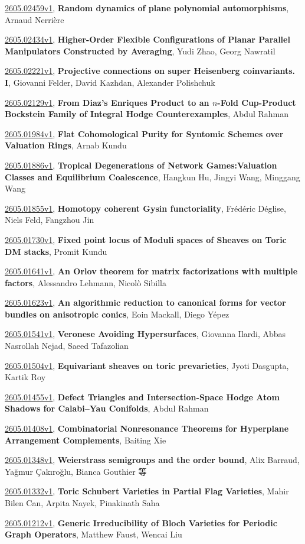\documentclass[9pt, a4paper]{article}
\theoremstyle{plain}
\theoremstyle{definition}
\theoremstyle{remark}
\newcommand{\arxiv}[3]{\href{https://arxiv.org/abs/#1}{#1}, \textbf{\textcolor{arxivblue}{#2}}, #3}
\begin{document}
\arxiv{2605.02459v1}{Random dynamics of plane polynomial automorphisms}{Arnaud Nerrière}

\arxiv{2605.02434v1}{Higher-Order Flexible Configurations of Planar Parallel Manipulators Constructed by Averaging}{Yudi Zhao, Georg Nawratil}

\arxiv{2605.02221v1}{Projective connections on super Heisenberg coinvariants. I}{Giovanni Felder, David Kazhdan, Alexander Polishchuk}

\arxiv{2605.02129v1}{From Diaz's Enriques Product to an $n$-Fold Cup-Product Bockstein Family of Integral Hodge Counterexamples}{Abdul Rahman}

\arxiv{2605.01984v1}{Flat Cohomological Purity for Syntomic Schemes over Valuation Rings}{Arnab Kundu}

\arxiv{2605.01886v1}{Tropical Degenerations of Network Games:Valuation Classes and Equilibrium Coalescence}{Hangkun Hu, Jingyi Wang, Minggang Wang}

\arxiv{2605.01855v1}{Homotopy coherent Gysin functoriality}{Frédéric Déglise, Niels Feld, Fangzhou Jin}

\arxiv{2605.01730v1}{Fixed point locus of Moduli spaces of Sheaves on Toric DM stacks}{Promit Kundu}

\arxiv{2605.01641v1}{An Orlov theorem for matrix factorizations with multiple factors}{Alessandro Lehmann, Nicolò Sibilla}

\arxiv{2605.01623v1}{An algorithmic reduction to canonical forms for vector bundles on anisotropic conics}{Eoin Mackall, Diego Yépez}

\arxiv{2605.01541v1}{Veronese Avoiding Hypersurfaces}{Giovanna Ilardi, Abbas Nasrollah Nejad, Saeed Tafazolian}

\arxiv{2605.01504v1}{Equivariant sheaves on toric prevarieties}{Jyoti Dasgupta, Kartik Roy}

\arxiv{2605.01455v1}{Defect Triangles and Intersection-Space Hodge Atom Shadows for Calabi--Yau Conifolds}{Abdul Rahman}

\arxiv{2605.01408v1}{Combinatorial Nonresonance Theorems for Hyperplane Arrangement Complements}{Baiting Xie}

\arxiv{2605.01348v1}{Weierstrass semigroups and the order bound}{Alix Barraud, Yağmur Çakıroğlu, Bianca Gouthier 等}

\arxiv{2605.01332v1}{Toric Schubert Varieties in Partial Flag Varieties}{Mahir Bilen Can, Arpita Nayek, Pinakinath Saha}

\arxiv{2605.01212v1}{Generic Irreducibility of Bloch Varieties for Periodic Graph Operators}{Matthew Faust, Wencai Liu}
\end{document}
